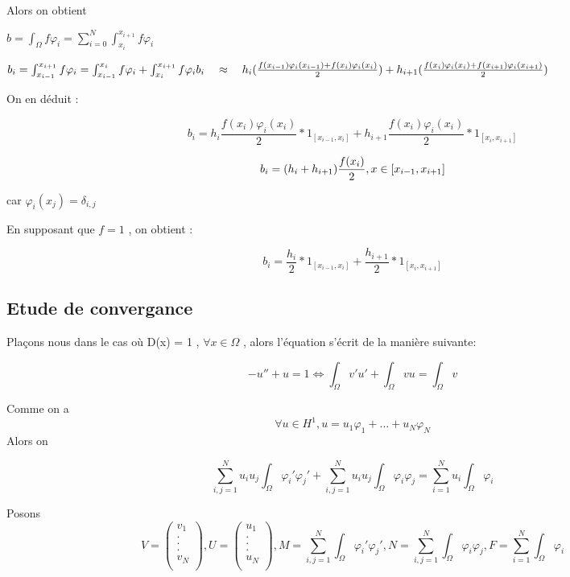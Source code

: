 \documentclass[12pt]{article}
\begin{document}
Alors on obtient 


$
b = \int_{\Omega} f \varphi_i  = \sum_{i = 0}^{N} \int_{x_{i}}^{x_{i+1}} f \varphi_i   
$


$
b_{i} = \int_{x_{i-1}}^{x_{i+1}} f \varphi_i  = \int_{x_{i-1}}^{x_{i}} f \varphi_i +
\int_{x_{i}}^{x_{i+1}} f \varphi_i \\ 
b_{i} \quad \approx\quad  
h_{i} (\frac{f(x_{i-1})\varphi_i(x_{i-1})  + f(x_{i})\varphi_i(x_{i}) }{2}) +
h_{i+1} (\frac{f(x_{i})\varphi_i(x_{i})  + f(x_{i+1})\varphi_i(x_{i+1}) }{2}) 
$

On en déduit :

$$
b_{i} = 
h_{i} \frac{ f(x_{i})\varphi_i(x_{i}) }{2} *1_{[x_{i-1},x_{i}]} + 
h_{i+1} \frac{f(x_{i})\varphi_i(x_{i}) }{2}*1_{[x_{i},x_{i+1}]} 
$$

$$
b_{i} =  (h_{i} + h_{i+1}) \frac{ f(x_{i}) }{2}  , x \in [x_{i-
1},x_{i+1}] \\
$$

car $\varphi_i(x_j)  = \delta_{i,j}$
 
En supposant que $ f = 1 $ , on obtient :  

$$
b_{i} = 
\frac{ h_{i}  }{2}*1_{[x_{i-1},x_{i}]} +
\frac{h_{i+1} }{2}*1_{[x_{i},x_{i+1}]} 
$$


 

\subsection{Etude de convergance}

Plaçons nous dans le cas où D(x) = 1 , $ \forall x \in \Omega $ , alors l'équation s'écrit de la manière suivante:

$$
-u'' + u = 1
\Longleftrightarrow
\int_{\Omega} v'u'  + \int_{\Omega} vu =  \int_{\Omega} v 
$$

Comme on a 
$$
\forall u \in H^{1} , u = u_{1}\varphi_1 + ...+u_{N}\varphi_N 
$$
Alors on 

$$
\sum_{i,j = 1}^{N} u_i u_j\int_{\Omega} \varphi_i'\varphi_j' + \sum_{i,j = 1}^{N} u_i u_j\int_{\Omega} \varphi_i\varphi_j = \sum_{i = 1}^{N} u_i\int_{\Omega} \varphi_i
$$

Posons 
$$
V = \begin{pmatrix}
v_{1}\\
. \\
. \\
. \\
v_{N}\\
\end{pmatrix} , 
U =\begin{pmatrix}
u_{1}\\
. \\
. \\
. \\
u_{N}\\
\end{pmatrix},
M = \sum_{i,j = 1}^{N} \int_{\Omega} \varphi_i'\varphi_j',
N = \sum_{i,j = 1}^{N} \int_{\Omega} \varphi_i\varphi_j,
F = \sum_{i = 1}^{N} \int_{\Omega} \varphi_i
$$
\end{document}
